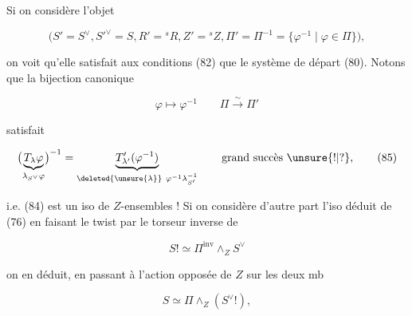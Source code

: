 

Si on considère l'objet

\[
\bigl(S'=S^\vee,S'^\vee=S,R'={}^sR,Z'={}^sZ,\Pi'=\Pi^{-1}=\{\varphi^{-1}\mid\varphi\in\Pi\}\bigr),\tag*{(83)}
\]

on voit qu'elle satisfait aux  conditions (82) que le système de départ (80). Notons que la bijection canonique

\[
\varphi\longmapsto\varphi^{-1}\qquad\Pi\xrightarrow{\sim}\Pi'\tag*{(84)}
\]

satisfait

\[
\bigl(\underbrace{T_\lambda\varphi}_{\lambda_{S^\vee}\varphi}\bigr)^{-1}
=\underbrace{T'_{\lambda'}(\varphi^{-1})}_{\deleted{\unsure{\lambda}}\ \varphi^{-1}\lambda_{S'}^{-1}}
\qquad\text{grand succès \unsure{!|?}},\tag*{(85)}
\]



i.e. (84) est  un iso de $Z$-ensembles ! Si on considère d'autre part l'iso déduit de (76) en  faisant le twist par  le torseur inverse de \deleted{$\Pi$}

\[
S!\simeq\Pi^{\mathrm{inv}}\wedge_Z S^\vee
\]

on en déduit, en passant à l'action opposée de $Z$ sur les deux mb

\[
S\simeq\Pi\wedge_Z(S^\vee!),\tag*{(86)}
\]

